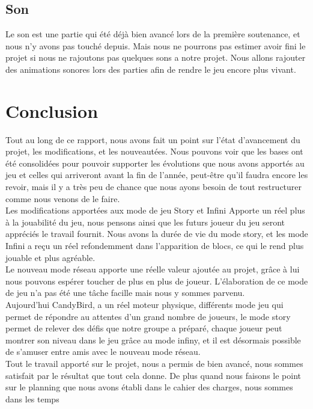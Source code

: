 \documentclass [11pt]{report}
\begin{document}
	\section{Son}
		Le son est une partie qui \'et\'e d\'ej\`a bien avanc\'e  lors de la premi\`ere soutenance, et nous n'y avons pas touch\'e depuis. Mais nous ne pourrons pas estimer avoir fini le projet si nous ne rajoutons pas quelques sons a notre projet. Nous allons rajouter des animations sonores lors des parties afin de rendre le jeu encore plus vivant.
		
\chapter*{Conclusion}
	Tout au long de ce rapport, nous avons fait un point sur l'\'etat d'avancement du projet, les modifications, et les nouveaut\'ees. Nous pouvons voir que les bases ont \'et\'e consolid\'ees pour pouvoir supporter les \'evolutions que nous avons apport\'es au jeu et celles qui arriveront avant la fin de l'ann\'ee, peut-\^etre qu'il faudra encore les revoir, mais il y a tr\`es peu de chance que nous ayons besoin de tout restructurer comme nous venons de le faire. \\
	
	Les modifications apport\'ees aux mode de jeu Story et Infini Apporte un r\'eel plus \`a la jouabilit\'e du jeu, nous pensons ainsi que les futurs joueur du jeu seront appr\'eci\'es le travail fournit. Nous avons la dur\'ee de vie du mode story, et les mode Infini a reçu un r\'eel refondemment dans l'apparition de blocs, ce qui le rend plus jouable et plus agr\'eable.\\
	
	Le nouveau mode r\'eseau apporte une r\'eelle valeur ajout\'ee au projet, gr\^ace \`a lui nous pouvons esp\'erer toucher de plus en plus de joueur. L'\'elaboration de ce mode de jeu n'a pas \'et\'e une t\^ache facille mais nous y sommes parvenu.\\
	
	Aujourd'hui CandyBird, a un r\'eel moteur physique, diff\'erents mode jeu qui permet de r\'epondre au attentes d'un grand nombre de joueurs, le mode story permet de relever des d\'efis que notre groupe a pr\'epar\'e, chaque joueur peut montrer son niveau dans le jeu gr\^ace au mode infiny, et il est d\'esormais possible de s'amuser entre amis avec le nouveau mode r\'eseau.\\
	
	Tout le travail apport\'e sur le projet, nous a permis de bien avanc\'e, nous sommes satisfait par le r\'esultat que tout cela donne. De plus quand nous faisons le point sur le planning que nous avons \'etabli dans le cahier des charges, nous sommes dans les temps 
\end{document}
